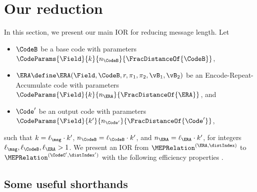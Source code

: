 \doclearpage
\section{Our reduction}
\label{sec:codeswitching}

In this section, we present our main IOR for reducing message length. Let
\begin{itemize}
    \item $\CodeB$ be a base code with parameters $\CodeParams{\Field}{k}{n_{\CodeB}}{\FracDistanceOf{\CodeB}}$,
    \item $\ERA \define \ERA(\Field, \CodeB, r, \pi_1, \pi_2, \vB_1, \vB_2)$ be an Encode-Repeat-Accumulate code with parameters $\CodeParams{\Field}{k}{n_{\ERA}}{\FracDistanceOf{\ERA}}$, and
    \item $\Code'$ be an output code with parameters $\CodeParams{\Field}{k'}{n_{\Code'}}{\FracDistanceOf{\Code'}}$,
\end{itemize}
such that $k = \ell_{\msg} \cdot k'$, $n_{\CodeB} = \ell_{\CodeB} \cdot k'$, and $n_{\ERA} = \ell_{\ERA} \cdot k'$, for integers $\ell_{\msg}, \ell_{\CodeB}, \ell_{\ERA} > 1$.
We present an IOR from $\MEPRelation^{(\ERA, \distIndex)}$ to $\MEPRelation^{(\CodeC', \distIndex')}$ with the following efficiency properties .










\subsection{Some useful shorthands}
\label{sec:shorthands}

